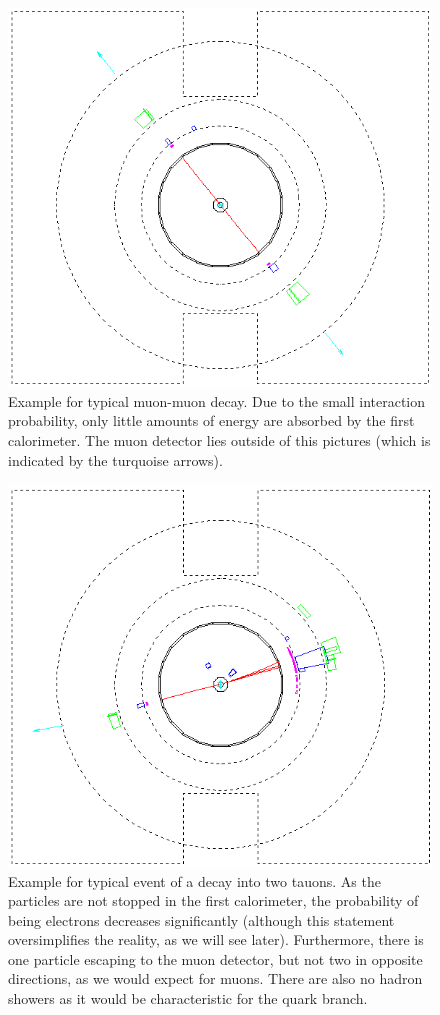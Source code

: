 \begin{figure}[htpb]
    \centering
    \includegraphics[width=0.8\linewidth]{figures/mm_02.png}
    \caption{Example for typical muon-muon decay. Due to the small interaction probability, 
        only little amounts of energy are absorbed by the first calorimeter. The muon detector lies outside of this pictures (which
    is indicated by the turquoise arrows). }
\label{fig:mm}
\end{figure}

\begin{figure}[htpb]
    \centering
    \includegraphics[width=0.8\linewidth]{figures/tt_02.png}
    \caption{Example for typical event of a decay into two tauons. As the particles are not
        stopped in the first calorimeter, the probability of being electrons decreases
        significantly (although this statement oversimplifies the reality, as we will see later). Furthermore,
        there is one particle escaping to the muon detector, but not two in opposite
        directions, as we would expect for muons. There are also no hadron showers
        as it would be characteristic for the quark branch. }
\label{fig:tt}
\end{figure}

